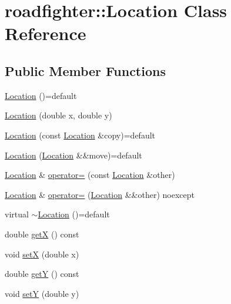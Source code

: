 \hypertarget{classroadfighter_1_1Location}{}\section{roadfighter\+:\+:Location Class Reference}
\label{classroadfighter_1_1Location}
\subsection*{Public Member Functions}
\begin{DoxyCompactItemize}
\item 
\hyperlink{classroadfighter_1_1Location_a395576ed62896c91fde69ec96067b76d}{Location} ()=default
\item 
\hyperlink{classroadfighter_1_1Location_a4c8cbcc76ddad6145cf0930c7840abc2}{Location} (double x, double y)
\item 
\hyperlink{classroadfighter_1_1Location_ac3e3afdb0b4c32abdd92d771d1ddf2be}{Location} (const \hyperlink{classroadfighter_1_1Location}{Location} \&copy)=default
\item 
\hyperlink{classroadfighter_1_1Location_a62ad632660a51914e36ec61bc8f3aa8d}{Location} (\hyperlink{classroadfighter_1_1Location}{Location} \&\&move)=default
\item 
\hyperlink{classroadfighter_1_1Location}{Location} \& \hyperlink{classroadfighter_1_1Location_a44b584ce6b39f638d08709ae370feaf4}{operator=} (const \hyperlink{classroadfighter_1_1Location}{Location} \&other)
\item 
\hyperlink{classroadfighter_1_1Location}{Location} \& \hyperlink{classroadfighter_1_1Location_a638a7648859525b0f56cc2fcc49de6f2}{operator=} (\hyperlink{classroadfighter_1_1Location}{Location} \&\&other) noexcept
\item 
virtual \hyperlink{classroadfighter_1_1Location_a074a1b1dd7011f53da1f1cd18669f074}{$\sim$\+Location} ()=default
\item 
double \hyperlink{classroadfighter_1_1Location_aa06be0d4efd3bcf984c65d85506057fd}{getX} () const
\item 
void \hyperlink{classroadfighter_1_1Location_ac58576927a3841e2ac0f3a14238be14f}{setX} (double x)
\item 
double \hyperlink{classroadfighter_1_1Location_ae249866ad25f0127591f1abd478a17cd}{getY} () const
\item 
void \hyperlink{classroadfighter_1_1Location_ace0dc3e91d430176c43ec88c2bc4677c}{setY} (double y)
\item 

\end{DoxyCompactItemize}
